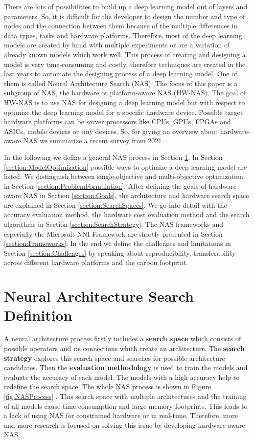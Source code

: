 \documentclass[conference]{IEEEtran}
\begin{document}
There are lots of possibilities to build up a deep learning model out of layers and parameters. So, it is difficult for the developer to design the number and type of nodes and the connection between them because of the multiple differences in data types, tasks and hardware platforms. Therefore, most of the deep learning models are created by hand with multiple experiments or are a variation of already known models which work well. This process of creating and designing a model is very time-consuming and costly, therefore techniques are created in the last years to automate the designing process of a deep learning model. One of them is called Neural Architecture Search (NAS). The focus of this paper is a subgroup of NAS, the hardware or platform-aware NAS (HW-NAS). The goal of HW-NAS is to use NAS for designing a deep learning model but with respect to optimize the deep learning model for a specific hardware device. Possible target hardware platforms can be server processors like CPUs, GPUs, FPGAs and ASICs, mobile devices or tiny devices. So, for giving an overview about hardware-aware NAS we summarize a recent survey from 2021 \cite{bib1}. 

In the following we define a general NAS process in Section \ref{section:NASDefinition}. In Section \ref{section:ModelOptimization} possible ways to optimize a deep learning model are listed. We distinguish between single-objective and multi-objective optimization in Section \ref{section:ProblemFormulation}. After defining the goals of hardware-aware NAS in Section \ref{section:Goals}, the architecture and hardware search space are explained in Section \ref{section:SearchSpaces}. We go into detail with the accuracy evaluation method, the hardware cost evaluation method and the search algorithms in Section \ref{section:SearchStrategy}. The NAS frameworks and especially the Microsoft NNI Framework are shortly presented in Section \ref{section:Frameworks}. In the end we define the challenges and limitations in Section \ref{section:Challenges} by speaking about reproducibility, transferability across different hardware platforms and the carbon footprint.  

\section{Neural Architecture Search Definition}
\label{section:NASDefinition}
A neural architecture process firstly includes a \textbf{search space} which consists of possible operators and its connections which create an architecture. The \textbf{search strategy} explores this search space and searches for possible architecture candidates. Then the \textbf{evaluation methodology} is used to train the models and evaluate the accuracy of each model. The models with a high accuracy help to redefine the search space. The whole NAS process is shown in Figure \ref{fig:NASProcess} \cite{bib1}. This search space with multiple architectures and the training of all models cause time consumption and large memory footprints. This leads to a lack of using NAS for constrained hardware or in real-time. Therefore, more and more research is focused on solving this issue by developing hardware-aware NAS. 
\end{document}
